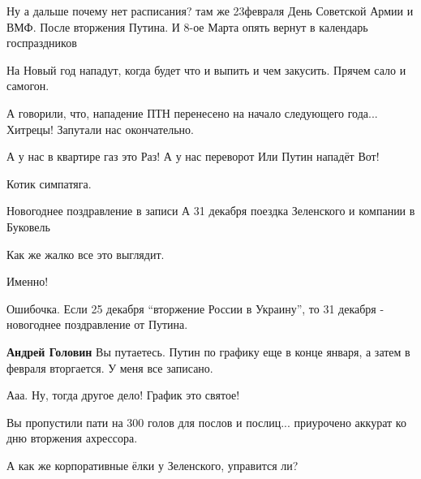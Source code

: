 \begin{itemize}

Ну а дальше почему нет расписания? там же 23февраля День Советской Армии и ВМФ.
После вторжения Путина. И 8-ое Марта опять вернут в календарь госпраздников


На Новый год нападут, когда будет что и выпить и чем закусить. Прячем сало и самогон.

А говорили, что, нападение ПТН перенесено на начало следующего года... Хитрецы! Запутали нас окончательно.

А у нас в квартире газ
это Раз!
А у нас переворот
Или Путин нападёт
Вот!

Котик симпатяга.

Новогоднее поздравление в записи
А 31 декабря поездка Зеленского и компании в Буковель

Как же жалко все это выглядит.

Именно!


Ошибочка. Если 25 декабря \enquote{вторжение России в Украину}, то 31 декабря -
новогоднее поздравление от Путина.

\begin{itemize} %
\textbf{Андрей Головин} Вы путаетесь. Путин по графику еще в конце января, а затем в февраля вторгается. У меня все записано.

Ааа. Ну, тогда другое дело! График это святое!
\end{itemize} %

Вы пропустили пати на 300 голов для послов и послиц... приурочено аккурат ко дню вторжения ахрессора.

А как же корпоративные ёлки у Зеленского, управится ли?

\end{itemize} %
